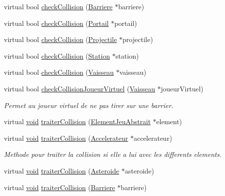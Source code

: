 \begin{DoxyCompactItemize}
\item 
virtual bool \hyperlink{class_barriere_a3f1b279f8b739e3d06b39d5f6fabc30c}{check\-Collision} (\hyperlink{class_barriere}{Barriere} $\ast$barriere)
\item 
virtual bool \hyperlink{class_barriere_aafcaa584b3a1b994cb94fa192505c659}{check\-Collision} (\hyperlink{class_portail}{Portail} $\ast$portail)
\item 
virtual bool \hyperlink{group__inf2990_ga7a3b327a7f30283a2e6b79bc79eb0040}{check\-Collision} (\hyperlink{class_projectile}{Projectile} $\ast$projectile)
\item 
virtual bool \hyperlink{class_barriere_afd75ee9a9f902f065384684520438feb}{check\-Collision} (\hyperlink{class_station}{Station} $\ast$station)
\item 
virtual bool \hyperlink{group__inf2990_ga92014a0e895d1a7dd1c637a2033c2809}{check\-Collision} (\hyperlink{class_vaisseau}{Vaisseau} $\ast$vaisseau)
\item 
virtual bool \hyperlink{group__inf2990_gac7d66192494684c4e7bcdd00fa9b7ab2}{check\-Collision\-Joueur\-Virtuel} (\hyperlink{class_vaisseau}{Vaisseau} $\ast$joueur\-Virtuel)
\begin{DoxyCompactList}\small\item\em Permet au joueur virtuel de ne pas tirer sur une barrier. \end{DoxyCompactList}\item 
virtual \hyperlink{wglew_8h_aeea6e3dfae3acf232096f57d2d57f084}{void} \hyperlink{group__inf2990_gafc3817554324d494409e24e195088892}{traiter\-Collision} (\hyperlink{class_element_jeu_abstrait}{Element\-Jeu\-Abstrait} $\ast$element)
\item 
virtual \hyperlink{wglew_8h_aeea6e3dfae3acf232096f57d2d57f084}{void} \hyperlink{class_barriere_a06cd05cc1baba83705e4999d1109c4b0}{traiter\-Collision} (\hyperlink{class_accelerateur}{Accelerateur} $\ast$accelerateur)
\begin{DoxyCompactList}\small\item\em Methode pour traiter la collision si elle a lui avec les differents elements. \end{DoxyCompactList}\item 
virtual \hyperlink{wglew_8h_aeea6e3dfae3acf232096f57d2d57f084}{void} \hyperlink{group__inf2990_ga187a42d83d5060894239c0ba34d18a8e}{traiter\-Collision} (\hyperlink{class_asteroide}{Asteroide} $\ast$asteroide)
\item 
virtual \hyperlink{wglew_8h_aeea6e3dfae3acf232096f57d2d57f084}{void} \hyperlink{class_barriere_aceff2c03891e91ab4e6e43785d0680ee}{traiter\-Collision} (\hyperlink{class_barriere}{Barriere} $\ast$barriere)

\end{DoxyCompactItemize}
